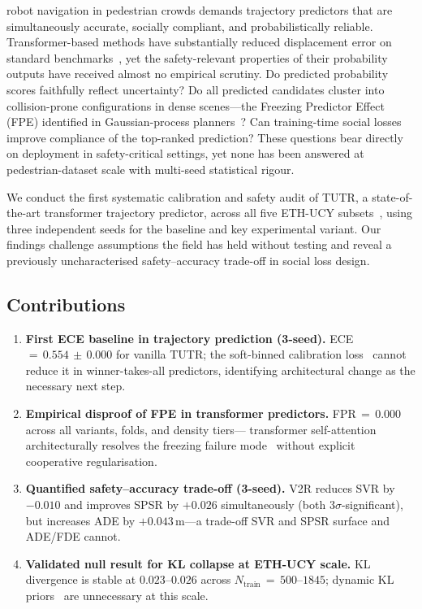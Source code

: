 \documentclass[journal]{IEEEtran}
\begin{document}
 robot navigation in pedestrian crowds demands
trajectory predictors that are simultaneously accurate, socially
compliant, and probabilistically reliable.
Transformer-based methods have substantially reduced displacement error
on standard benchmarks~\cite{shi2023tutr,mohamed2020social}, yet the
safety-relevant properties of their probability outputs have received
almost no empirical scrutiny.
Do predicted probability scores faithfully reflect uncertainty?
Do all predicted candidates cluster into collision-prone configurations
in dense scenes---the Freezing Predictor Effect (FPE) identified in
Gaussian-process planners~\cite{trautman2010unfreezing}?
Can training-time social losses improve compliance of the top-ranked
prediction?
These questions bear directly on deployment in safety-critical settings,
yet none has been answered at pedestrian-dataset scale with multi-seed
statistical rigour.

We conduct the first systematic calibration and safety audit of TUTR,
a state-of-the-art transformer trajectory predictor, across all five
ETH-UCY subsets~\cite{pellegrini2009eth,lerner2007ucy}, using three
independent seeds for the baseline and key experimental variant.
Our findings challenge assumptions the field has held without testing
and reveal a previously uncharacterised safety--accuracy trade-off in
social loss design.

\subsection*{Contributions}

\begin{enumerate}

\item \textbf{First ECE baseline in trajectory prediction (3-seed).}
ECE\,\(=\,0.554\,\pm\,0.000\) for vanilla TUTR; the soft-binned
calibration loss~\cite{karandikar2021soft} cannot reduce it in
winner-takes-all predictors, identifying architectural change as the
necessary next step.

\item \textbf{Empirical disproof of FPE in transformer predictors.}
FPR\,\(=\,0.000\) across all variants, folds, and density tiers---
transformer self-attention architecturally resolves the freezing
failure mode~\cite{trautman2010unfreezing} without explicit cooperative
regularisation.

\item \textbf{Quantified safety--accuracy trade-off (3-seed).}
V2R reduces SVR by \(-0.010\) and improves SPSR by \(+0.026\)
simultaneously (both \(3\sigma\)-significant), but increases ADE
by \(+0.043\)\,m---a trade-off SVR and SPSR surface and ADE/FDE
cannot.

\item \textbf{Validated null result for KL collapse at ETH-UCY scale.}
KL divergence is stable at \(0.023\)--\(0.026\) across
\(N_{\text{train}}\,{=}\,500\)--\(1845\); dynamic KL
priors~\cite{zhang2025openworld} are unnecessary at this scale.

\end{enumerate}
\end{document}
